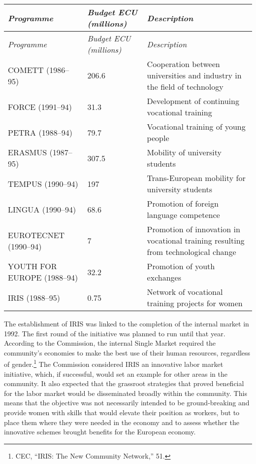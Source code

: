 \documentclass{tufte-handout}
\begin{document}
\tabulinesep=1.1mm
{\begin{longtabu} to 1\textwidth { X[l] X[c] X[l]} 
\emph{Programme} & \emph{Budget ECU (millions)} & \emph{Description} \\
\endfirsthead
\emph{Programme} & \emph{Budget ECU (millions)} & \emph{Description} \\
\endhead
COMETT (1986--95) & 206.6 & Cooperation between universities and
industry in the field of technology \\
FORCE (1991--94) & 31.3 & Development of continuing vocational
training \\
PETRA (1988--94) & 79.7 & Vocational training of young people \\
ERASMUS (1987--95) & 307.5 & Mobility of university students \\
TEMPUS (1990--94) & 197 & Trans-European mobility for university
students \\
LINGUA (1990--94) & 68.6 & Promotion of foreign language competence \\
EUROTECNET (1990--94) & 7 & Promotion of innovation in vocational
training resulting from technological change \\
YOUTH FOR EUROPE (1988--94) & 32.2 & Promotion of youth exchanges \\
IRIS (1988--95) & 0.75 & Network of vocational training projects for
women \\
\end{longtabu}}

\vspace{0.2in}

The establishment of IRIS was linked to the completion of the internal
market in 1992. The first round of the initiative was planned to run
until that year. According to the Commission, the internal Single Market
required the community's economies to make the best use of their human
resources, regardless of gender.\footnote{CEC, ``IRIS: The New Community
  Network,'' 51.} The Commission considered IRIS an innovative labor
market initiative, which, if successful, would set an example for other
areas in the community. It also expected that the grassroot strategies
that proved beneficial for the labor market would be disseminated
broadly within the community. This means that the objective was not
necessarily intended to be ground-breaking and provide women with skills
that would elevate their position as workers, but to place them where
they were needed in the economy and to assess whether the innovative
schemes brought benefits for the European economy.
\end{document}
